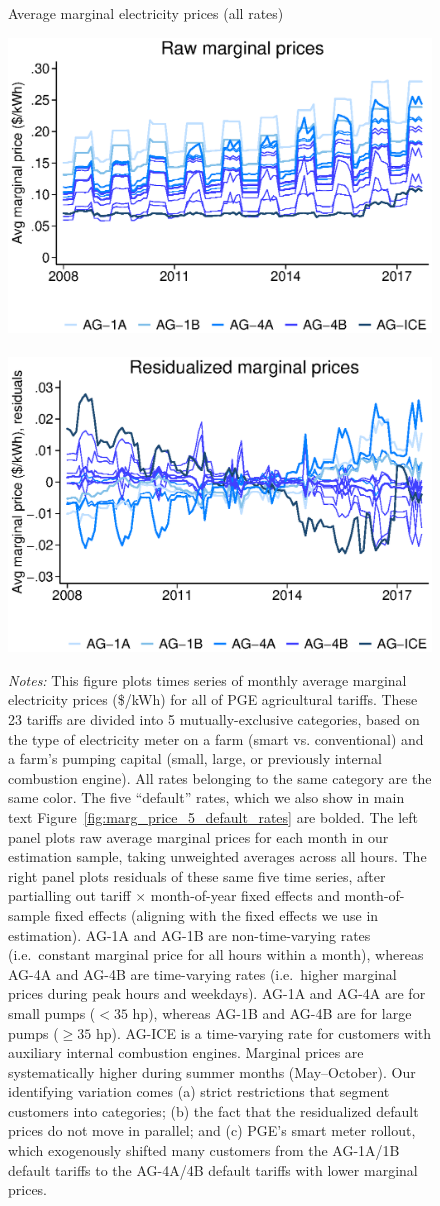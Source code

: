 \begin{figure}[h!]\centering
\captionsetup{width=\textwidth}
\caption{Average marginal electricity prices (all rates)}
\label{fig:marg_price_all_rates}
\vspace{-2mm}
{\includegraphics[width=.495\textwidth]{figures/marg_price_all_rates_raw_wtitle.eps}}~
{\includegraphics[width=.495\textwidth]{figures/marg_price_all_rates_resid_wtitle.eps}}
\\
\captionsetup{width=\textwidth}
\caption*{\scriptsize \emph{Notes:} This figure plots times series of monthly average marginal electricity prices (\$/kWh) for all of PGE agricultural tariffs. These 23 tariffs are divided into 5 mutually-exclusive categories, based on the type of electricity meter on a farm (smart vs. conventional) and a farm's pumping capital (small, large, or previously internal combustion engine). All rates belonging to the same category are the same color. The five ``default'' rates, which we also show in main text Figure~\ref{fig:marg_price_5_default_rates} are bolded. The left panel plots raw average marginal prices for each month in our estimation sample, taking unweighted averages across all hours. The right panel plots residuals of these same five time series, after partialling out tariff $\times$ month-of-year fixed effects and month-of-sample fixed effects (aligning with the fixed effects we use in estimation). AG-1A and AG-1B are non-time-varying rates (i.e.\ constant marginal price for all hours within a month), whereas AG-4A and AG-4B are time-varying rates (i.e.\ higher marginal prices during peak hours and weekdays). AG-1A and AG-4A are for small pumps ($<35$ hp), whereas AG-1B and AG-4B are for large pumps ($\ge35$ hp). AG-ICE is a time-varying rate for customers with auxiliary internal combustion engines. Marginal prices are systematically higher during summer months (May--October). Our identifying variation comes (a) strict restrictions that segment customers into categories; (b) the fact that the residualized default prices do not move in parallel; and (c) PGE's smart meter rollout, which exogenously shifted many customers from the AG-1A/1B default tariffs to the AG-4A/4B default tariffs with lower marginal prices.}
\end{figure}